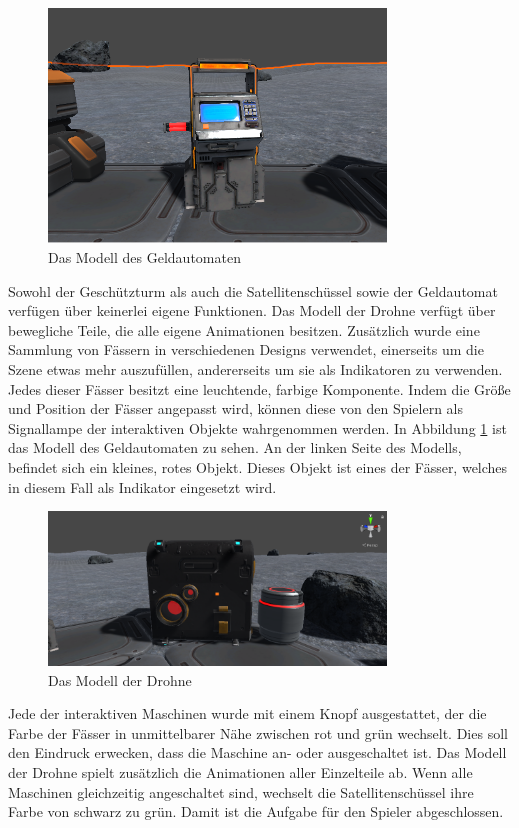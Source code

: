 \begin{figure}[H]
\centering
\includegraphics[width=0.8\textwidth]{ATM.PNG}
\caption{Das Modell des Geldautomaten}
\label{fig:ATM}
\end{figure}

Sowohl der Geschützturm als auch die Satellitenschüssel sowie der Geldautomat verfügen über keinerlei eigene Funktionen. Das Modell der Drohne verfügt über bewegliche Teile, die alle eigene Animationen besitzen. Zusätzlich wurde eine Sammlung von Fässern in verschiedenen Designs verwendet, einerseits um die Szene etwas mehr auszufüllen, andererseits um sie als Indikatoren zu verwenden. Jedes dieser Fässer besitzt eine leuchtende, farbige Komponente. Indem die Größe und Position der Fässer angepasst wird, können diese von den Spielern als Signallampe der interaktiven Objekte wahrgenommen werden. In Abbildung \ref{fig:ATM} ist das Modell des Geldautomaten zu sehen. An der linken Seite des Modells, befindet sich ein kleines, rotes Objekt. Dieses Objekt ist eines der Fässer, welches in diesem Fall als Indikator eingesetzt wird. 

\begin{figure}[H]
\centering
\includegraphics[width=0.8\textwidth]{Drone.PNG}
\caption{Das Modell der Drohne}
\end{figure}

Jede der interaktiven Maschinen wurde mit einem Knopf ausgestattet, der die Farbe der Fässer in unmittelbarer Nähe zwischen rot und grün wechselt. Dies soll den Eindruck erwecken, dass die Maschine an- oder ausgeschaltet ist. Das Modell der Drohne spielt zusätzlich die Animationen aller Einzelteile ab. Wenn alle Maschinen gleichzeitig angeschaltet sind, wechselt die Satellitenschüssel ihre Farbe von schwarz zu grün. Damit ist die Aufgabe für den Spieler abgeschlossen.\newline

